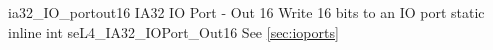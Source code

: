 %
%
%
%

\apidoc
{ia32_IO_portout16}
{IA32 IO Port - Out 16}
{Write 16 bits to an IO port}
{static inline int seL4\_IA32\_IOPort\_Out16 }
{
}
{\errorenumdesc}
{See \autoref{sec:ioports}}
